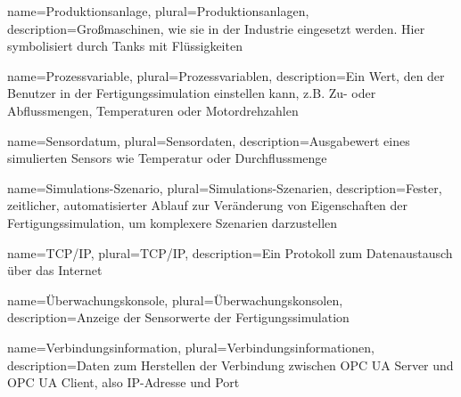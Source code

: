 {
  name=Produktionsanlage,
  plural=Produktionsanlagen,
  description={Großmaschinen, wie sie in der Industrie eingesetzt werden. Hier symbolisiert durch Tanks mit Flüssigkeiten}
}

{
  name=Prozessvariable,
  plural=Prozessvariablen,
  description={Ein Wert, den der Benutzer in der \gls{Fertigungssimulation} einstellen kann, z.B. Zu- oder Abflussmengen, Temperaturen oder Motordrehzahlen}
}

{
  name=Sensordatum,
  plural=Sensordaten,
  description={Ausgabewert eines simulierten Sensors wie Temperatur oder Durchflussmenge}
}

{
  name=Simulations-Szenario,
  plural=Simulations-Szenarien,
  description={Fester, zeitlicher, automatisierter Ablauf zur Veränderung von Eigenschaften der \gls{Fertigungssimulation}, um komplexere Szenarien darzustellen}
}

{
  name=TCP/IP,
  plural=TCP/IP,
  description={Ein Protokoll zum Datenaustausch über das Internet}
}

{
  name=Überwachungskonsole,
  plural=Überwachungskonsolen,
  description={Anzeige der Sensorwerte der \gls{Fertigungssimulation}}
}

{
  name=Verbindungsinformation,
  plural=Verbindungsinformationen,
  description={Daten zum Herstellen der Verbindung zwischen \gls{OPC UA Server} und \gls{OPC UA Client}, also \gls{IP-Adresse} und Port}
}